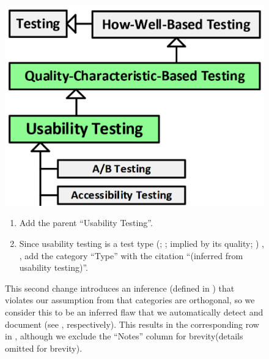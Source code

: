 \begin{figure}[h!]
\begin{minipage}{0.45\linewidth}
    \vspace{0.5cm}
    \includegraphics[width=\linewidth]{assets/images/a-b testing 2.png}
    \label{fig:Firesmith-A-B-Testing}
    \vspace{0.5cm}
\end{minipage}
\begin{minipage}{\ifnotpaper 0.53\else 0.5\fi\linewidth}
    \begin{enumerate}
        \item Add the parent ``Usability Testing''.
        \item Since usability testing is a test type \ifnotpaper
                  (\citealp[pp.~22, 26\=/27]{IEEE2022};
                  \citeyear[pp.~7, 40, Tab.~A.1]{IEEE2021c};
                  implied by its quality; \citealp[p.~53]{Firesmith2015})\else
                  \cite[pp.~22, 26\=/27]{IEEE2022},
                  \cite[pp.~7, 40, Tab.~A.1]{IEEE2021c}\fi, add the category
              ``Type'' with the citation ``(inferred from usability testing)''.
    \end{enumerate}
\end{minipage}
This second change introduces an inference \ifnotpaper (defined in )
\fi that violates our assumption \ifnotpaper from  \fi that
categories are orthogonal, so we consider this to be an inferred flaw that we
automatically detect and document \ifnotpaper (see , respectively). This results in the corresponding row
    in , although we exclude the ``Notes''
    column for brevity\else (details omitted for brevity)\fi.


\end{figure}
